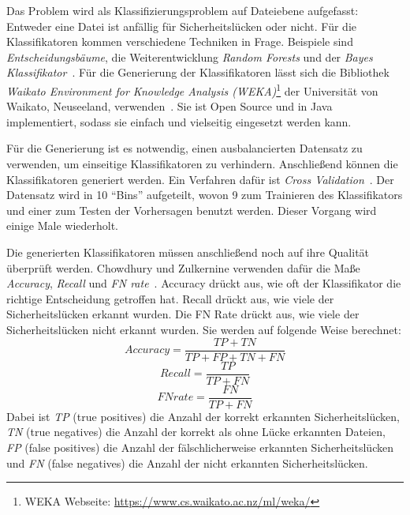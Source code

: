 Das Problem wird als Klassifizierungsproblem auf Dateiebene aufgefasst:
Entweder eine Datei ist anfällig für Sicherheitslücken oder nicht.
Für die Klassifikatoren kommen verschiedene Techniken in Frage.
Beispiele sind \emph{Entscheidungsbäume}, die Weiterentwicklung \emph{Random Forests} und der \emph{Bayes Klassifikator}~\cite{decision_trees}.
Für die Generierung der Klassifikatoren lässt sich die Bibliothek \emph{Waikato Environment for Knowledge Analysis (WEKA)}\footnote{WEKA Webseite: \url{https://www.cs.waikato.ac.nz/ml/weka/}} der Universität von Waikato, Neuseeland, verwenden~\cite{chowdhury_zulkernine_2009}.
Sie ist Open Source und in Java implementiert, sodass sie einfach und vielseitig eingesetzt werden kann.

Für die Generierung ist es notwendig, einen ausbalancierten Datensatz zu verwenden, um einseitige Klassifikatoren zu verhindern.
Anschließend können die Klassifikatoren generiert werden.
Ein Verfahren dafür ist \emph{Cross Validation}~\cite{chowdhury_zulkernine_2009}.
Der Datensatz wird in 10 "`Bins"' aufgeteilt, wovon 9 zum Trainieren des Klassifikators und einer zum Testen der Vorhersagen benutzt werden.
Dieser Vorgang wird einige Male wiederholt.

Die generierten Klassifikatoren müssen anschließend noch auf ihre Qualität überprüft werden.
Chowdhury und Zulkernine verwenden dafür die Maße \emph{Accuracy}, \emph{Recall} und \emph{FN rate}~\cite{chowdhury_zulkernine_2009}.
Accuracy drückt aus, wie oft der Klassifikator die richtige Entscheidung getroffen hat.
Recall drückt aus, wie viele der Sicherheitslücken erkannt wurden.
Die FN Rate drückt aus, wie viele der Sicherheitslücken nicht erkannt wurden.
Sie werden auf folgende Weise berechnet:
\begin{equation}
	Accuracy = \frac{TP+TN}{TP+FP+TN+FN}
\end{equation}
\begin{equation}
	Recall = \frac{TP}{TP+FN}
\end{equation}
\begin{equation}
	FN rate = \frac{FN}{TP+FN}
\end{equation}
Dabei ist \emph{TP} (true positives) die Anzahl der korrekt erkannten Sicherheitslücken,
\emph{TN} (true negatives) die Anzahl der korrekt als ohne Lücke erkannten Dateien,
\emph{FP} (false positives) die Anzahl der fälschlicherweise erkannten Sicherheitslücken und
\emph{FN} (false negatives) die Anzahl der nicht erkannten Sicherheitslücken.
